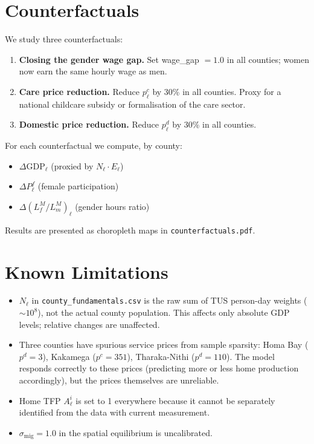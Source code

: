 \documentclass[11pt,a4paper]{article}
\begin{document}
\section{Counterfactuals}

We study three counterfactuals:

\begin{enumerate}[leftmargin=*]
  \item \textbf{Closing the gender wage gap.} Set wage\_gap $= 1.0$
    in all counties; women now earn the same hourly wage as men.
  \item \textbf{Care price reduction.} Reduce $p^c_\ell$ by 30\% in
    all counties. Proxy for a national childcare subsidy or formalisation
    of the care sector.
  \item \textbf{Domestic price reduction.} Reduce $p^d_\ell$ by 30\%
    in all counties.
\end{enumerate}

For each counterfactual we compute, by county:
\begin{itemize}[noitemsep]
  \item $\Delta\text{GDP}_\ell$ (proxied by $N_\ell \cdot E_\ell$)
  \item $\Delta P^f_\ell$ (female participation)
  \item $\Delta(L^M_f / L^M_m)_\ell$ (gender hours ratio)
\end{itemize}

Results are presented as choropleth maps in \texttt{counterfactuals.pdf}.

\section{Known Limitations}

\begin{itemize}
  \item $N_\ell$ in \texttt{county\_fundamentals.csv} is the raw sum of
    TUS person-day weights ($\sim 10^8$), not the actual county population.
    This affects only absolute GDP levels; relative changes are unaffected.
  \item Three counties have spurious service prices from sample sparsity:
    Homa Bay ($p^d = 3$), Kakamega ($p^c = 351$), Tharaka-Nithi
    ($p^d = 110$). The model responds correctly to these prices
    (predicting more or less home production accordingly), but the
    prices themselves are unreliable.
  \item Home TFP $A^i_\ell$ is set to 1 everywhere because it cannot
    be separately identified from the data with current measurement.
  \item $\sigma_{\text{mig}} = 1.0$ in the spatial equilibrium is
    uncalibrated.
\end{itemize}
\end{document}

